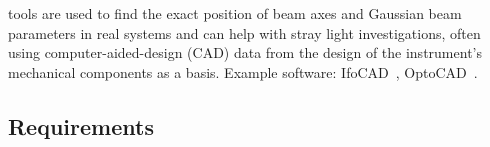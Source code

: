  tools are used to find the exact position of beam axes and Gaussian beam parameters in real systems and can help with stray light investigations, often using computer-aided-design (CAD) data from the design of the instrument's mechanical components as a basis. Example software: IfoCAD~\cite{IfoCAD, kochkina}, OptoCAD~\cite{OptoCAD}.

\subsection{Requirements}
\label{sec:Sim:Req}


